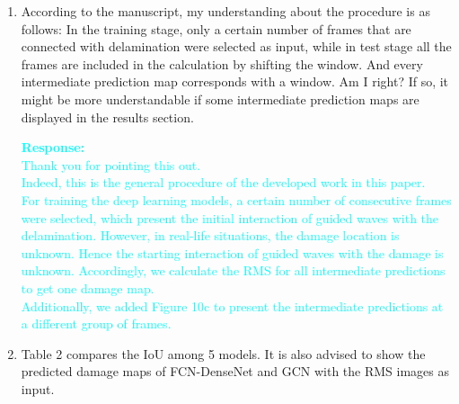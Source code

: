 \documentclass[11pt,a2paper]{report}
\begin{document}
\begin{enumerate}
	\item According to the manuscript, my understanding about the procedure is 
	as follows: In the training stage, only a certain number of frames that are 
	connected with delamination were selected as input, while in test stage all 
	the frames are included in the calculation by shifting the window.
	And every intermediate prediction map corresponds with a window. 
	Am I right? If so, it might be more understandable if some intermediate 
	prediction maps are displayed in the results section.

\textcolor{Cyan}{
	\textbf{Response:} \\
	Thank you for pointing this out. \\
	Indeed, this is the general procedure of the developed work in this paper.\\
	For training the deep learning models, a certain number of consecutive frames were selected, which present the initial interaction of guided waves with the delamination.
	However, in real-life situations, the damage location is unknown.
	Hence the starting interaction of guided waves with the damage is unknown.
	Accordingly, we calculate the RMS for all intermediate predictions to get one damage map. \\
	Additionally, we added Figure 10c to present the intermediate predictions at a different group of frames.
}

	\item Table 2 compares the IoU among 5 models. 
	It is also advised to show 
	the predicted damage maps of FCN-DenseNet and GCN with the RMS images as 
	input.


\end{enumerate}
\end{document}
